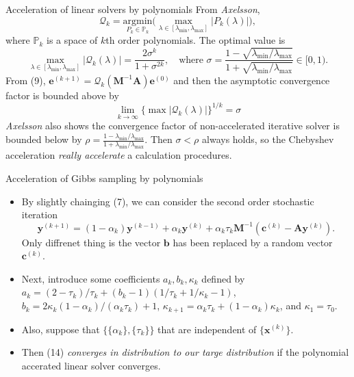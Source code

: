 \documentclass[10pt]{beamer}
\begin{document}
\begin{frame}{Acceleration of linear solvers by polynomials}
From \emph{Axelsson},
\begin{equation}
    \mathcal{Q}_k = \underset{{P_k \in \mathbb{P}_k}}{\text{argmin}}
    \bigg(
    \underset{\lambda \in [\lambda_{\min}, \lambda_{\max}]}{\max} |P_k(\lambda)|
    \bigg),
\end{equation}
where $\mathbb{P}_k$ is a space of $k$th order polynomials. The optimal value is
\begin{equation}
    \underset{\lambda \in [\lambda_{\min}, \lambda_{\max}]}{\max} |\mathcal{Q}_k(\lambda)|
    = \frac{2\sigma^k}{1 + \sigma^{2k}}, \quad
    \text{where }
    \sigma = \frac{1 - \sqrt{\lambda_{\min}/\lambda_{\max}}}
    {1 + \sqrt{\lambda_{\min}/\lambda_{\max}}} \in [0, 1).
\end{equation}
From (9), 
$\mathbf{e}^{(k+1)} = \mathcal{Q}_k(\mathbf{M}^{-1}\mathbf{A})\mathbf{e}^{(0)}$ and
then the asymptotic convergence factor is bounded above by
\begin{equation}
    \lim_{k \to \infty} \{\max |\mathcal{Q}_k(\lambda)|\}^{1/k} = \sigma 
\end{equation}
\emph{Axelsson} also shows the convergence factor of non-accelerated iterative solver is
bounded below by $\rho = \frac{1 - \lambda_{\min}/\lambda_{\max}}
{1 + \lambda_{\min}/\lambda_{\max}}.$
Then $\sigma < \rho$ always holds, 
so the Chebyshev acceleration \emph{\color{blue}really accelerate} a calculation procedures.

\end{frame}

\begin{frame}{Acceleration of Gibbs sampling by polynomials}
    \begin{itemize}
        \item By slightly chainging (7), we can consider the second order stochastic iteration
            \begin{equation}
                \mathbf{y}^{(k+1)} = 
                (1-\alpha_k)\mathbf{y}^{(k-1)} + \alpha_k \mathbf{y}^{(k)} +
                \alpha_k\tau_k\mathbf{M}^{-1}(\mathbf{c}^{(k)} - \mathbf{A}\mathbf{y}^{(k)}).
            \end{equation}
            Only diffrenet thing is the vector $\mathbf{b}$ 
            has been replaced by a random vector $\mathbf{c}^{(k)}$.
        \item Next, introduce some coefficients $a_k, b_k, \kappa_k$ defined by
            $a_k = (2-\tau_k)/\tau_k + (b_k-1)(1/\tau_k + 1/\kappa_k - 1)$, 
            $b_k = 2\kappa_k(1-\alpha_k)/(\alpha_k \tau_k) + 1$, 
            $\kappa_{k+1} = \alpha_k \tau_k + (1-\alpha_k)\kappa_k$, and $\kappa_1 = \tau_0$.
        \item Also, suppose that $\{\{\alpha_k\}, \{\tau_k\}\}$ that are independent of 
            $\{\mathbf{x}^{(k)}\}$.
        \item Then (14) \emph{\color{blue}converges in distribution to our targe distribution} if the polynomial accerated linear solver converges.
    \end{itemize}
\end{frame}
\end{document}
